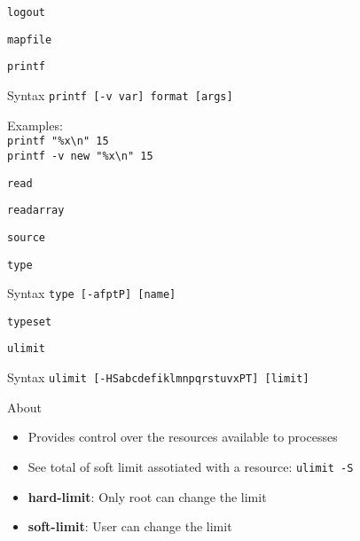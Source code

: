 \documentclass[10pt, compress, aspectratio=169]{beamer}
\begin{document}
\begin{frame}{\texttt{logout}}
\end{frame}

\begin{frame}{\texttt{mapfile}}
\end{frame}

\begin{frame}{\texttt{printf}}
  \begin{alertblock}{Syntax}
    \texttt{printf [-v var] format [args]}
  \end{alertblock}
  Examples: \\
  \texttt{printf "\%x\textbackslash{n}" 15} \\
  \texttt{printf -v new "\%x\textbackslash{n}" 15}
\end{frame}

\begin{frame}{\texttt{read}}
\end{frame}

\begin{frame}{\texttt{readarray}}
\end{frame}

\begin{frame}{\texttt{source}}
\end{frame}

\begin{frame}{\texttt{type}}
  \begin{alertblock}{Syntax}
    \texttt{type [-afptP] [name]}
  \end{alertblock}
\end{frame}

\begin{frame}{\texttt{typeset}}
\end{frame}

\begin{frame}{\texttt{ulimit}}
  \begin{alertblock}{Syntax}
    \texttt{ulimit [-HSabcdefiklmnpqrstuvxPT] [limit]}
  \end{alertblock}

  \begin{exampleblock}{About}
    \begin{itemize}
      \item Provides control over the resources available to processes
      \item See total of soft limit assotiated with a resource:
            \texttt{ulimit -S}
      \item \textbf{hard-limit}: Only root can change the limit
      \item \textbf{soft-limit}: User can change the limit
    \end{itemize}
  \end{exampleblock}
\end{frame}
\end{document}
